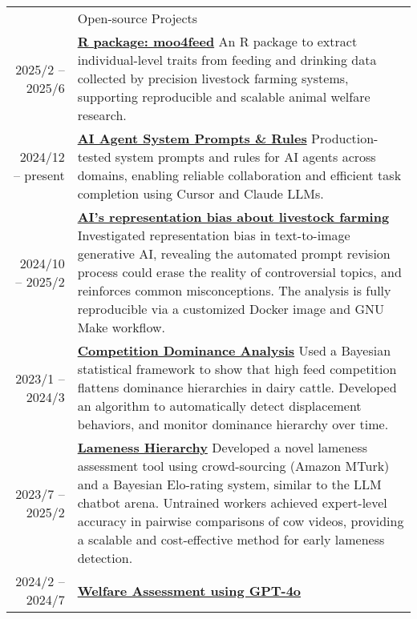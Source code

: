\documentclass[letterpaper, 11pt]{article}
\newcommand{\socialicon}[1]{\raisebox{-0.05em}{\resizebox{!}{1em}{#1}}}
\newcommand{\headingfont}{\Large\color{OliveGreen}}
\newenvironment{SectionTable}[1]{
	\renewcommand*{\arraystretch}{1.7}
	\setlength{\tabcolsep}{10pt}
	\begin{longtable}{Rp{5.2in}} & #1 \\}
{\end{longtable}\vspace{-.3cm}}
\begin{document}
\begin{SectionTable}{\headingfont Open-source Projects}
	2025/2 -- 2025/6 &
	\textbf{\href{https://skysheng7.github.io/moo4feed/}{R package: moo4feed}} \socialicon{\faGithub}  \newline
	An R package to extract individual-level traits from feeding and drinking data collected by precision livestock farming systems, supporting reproducible and scalable animal welfare research. \\
	2024/12 -- present &
	\textbf{\href{https://github.com/skysheng7/ai-agent-prompts}{AI Agent System Prompts \& Rules}} \socialicon{\faGithub}  \newline
    Production-tested system prompts and rules for AI agents across domains, enabling reliable collaboration and efficient task completion using Cursor and Claude LLMs. \\
	2024/10 -- 2025/2 &
	\textbf{\href{https://github.com/skysheng7/AI_bias_in_farming.git}{AI's representation bias about livestock farming}} \socialicon{\faGithub}  \newline
	Investigated representation bias in text-to-image generative AI, revealing the automated prompt revision process could erase the reality of controversial topics, and reinforces common misconceptions. The analysis is fully reproducible via a customized Docker image and GNU Make workflow. \\
	2023/1 -- 2024/3 &
	\textbf{\href{https://github.com/skysheng7/competition_dominance_analysis}{Competition Dominance Analysis}} \socialicon{\faGithub}  \newline
	Used a Bayesian statistical framework to show that high feed competition flattens dominance hierarchies in dairy cattle. Developed an algorithm to automatically detect displacement behaviors, and monitor dominance hierarchy over time. \\
	2023/7 -- 2025/2 &
	\textbf{\href{https://github.com/skysheng7/lameness_hierarchy}{Lameness Hierarchy}} \socialicon{\faGithub} \newline
	Developed a novel lameness assessment tool using crowd-sourcing (Amazon MTurk) and a Bayesian Elo-rating system, similar to the LLM chatbot arena. Untrained workers achieved expert-level accuracy in pairwise comparisons of cow videos, providing a scalable and cost-effective method for early lameness detection. \\
	2024/2 -- 2024/7 &
	\textbf{\href{https://github.com/skysheng7/welfare_assess_GPT4o}{Welfare Assessment using GPT-4o}} \socialicon{\faGithub} \newline

\end{SectionTable}
\end{document}

